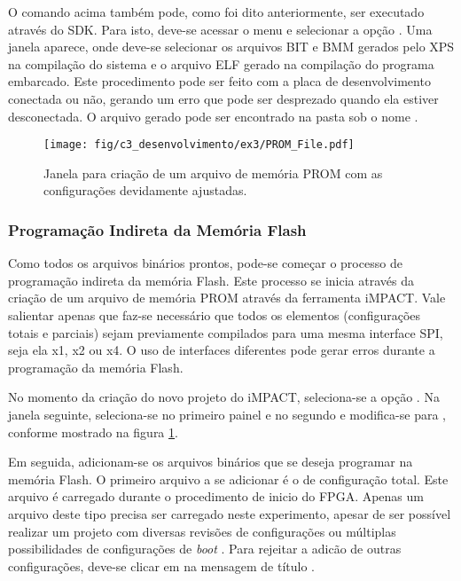 \documentclass[11pt,a4paper,oneside]{book}
\begin{document}
O comando acima também pode, como foi dito anteriormente, ser executado através do SDK.
Para isto, deve-se acessar o menu  e selecionar a opção .
Uma janela aparece, onde deve-se selecionar os arquivos BIT e BMM gerados pelo XPS na compilação do sistema e o arquivo ELF gerado na compilação do programa embarcado.
Este procedimento pode ser feito com a placa de desenvolvimento conectada ou não, gerando um erro que pode ser desprezado quando ela estiver desconectada.
O arquivo gerado pode ser encontrado na pasta  sob o nome .

\begin{figure}[htp]
\centering
\texttt{[image: fig/c3\_desenvolvimento/ex3/PROM\_File.pdf]}
\caption{Janela para criação de um arquivo de memória PROM com as configurações devidamente ajustadas.}
\label{fig:ex3:prom_file}
\end{figure}

\subsubsection{Programação Indireta da Memória Flash}
Como todos os arquivos binários prontos, pode-se começar o processo de programação indireta da memória Flash.
Este processo se inicia através da criação de um arquivo de memória PROM através da ferramenta iMPACT.
Vale salientar apenas que faz-se necessário que todos os elementos (configurações totais e parciais) sejam previamente compilados para uma mesma interface SPI, seja ela x1, x2 ou x4.
O uso de interfaces diferentes pode gerar erros durante a programação da memória Flash.

No momento da criação do novo projeto do iMPACT, seleciona-se a opção .
Na janela seguinte, seleciona-se  no primeiro painel e  no segundo e modifica-se  para , conforme mostrado na figura \ref{fig:ex3:prom_file}.

Em seguida, adicionam-se os arquivos binários que se deseja programar na memória Flash.
O primeiro arquivo a se adicionar é o de configuração total.
Este arquivo é carregado durante o procedimento de inicio do FPGA.
Apenas um arquivo deste tipo precisa ser carregado neste experimento, apesar de ser possível realizar um projeto com diversas revisões de configurações ou múltiplas possibilidades de configurações de \textit{boot} \cite{xapp468, xapp1100}.
Para rejeitar a adicão de outras configurações, deve-se clicar em  na mensagem de título .
\end{document}
